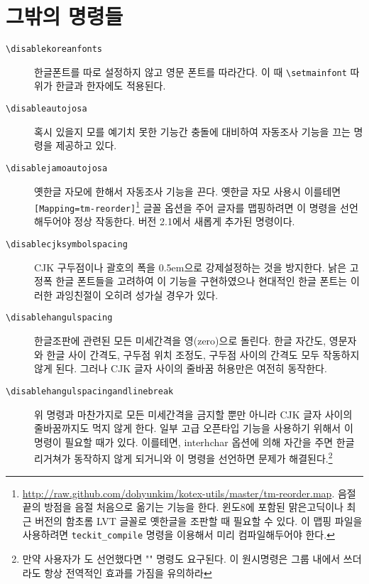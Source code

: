 \documentclass[a4paper]{article}
\def\logoko{\textsf{k}\kern-.1em\textit{o}}
\def\xetexko{\XeTeX\kern-.1ex -\logoko}
\def\cs#1{\texttt{\color{blue!50!black}\textbackslash #1}}
\begin{document}
\section{그밖의 명령들}
\begin{description}
  \item[\cs{disablekoreanfonts}]
한글폰트를 따로 설정하지 않고 영문 폰트를 따라간다.
이 때  \verb|\setmainfont| 따위가 한글과 한자에도 적용된다.

  \item[\cs{disableautojosa}]
혹시 있을지 모를 예기치 못한 기능간 충돌에 대비하여 자동조사 기능을
끄는 명령을 제공하고 있다.

  \item[\cs{disablejamoautojosa}]
옛한글 자모에 한해서 자동조사 기능을 끈다.
옛한글 자모 사용시 이를테면 \verb|[Mapping=tm-reorder]|\footnote{%
  \url{http://raw.github.com/dohyunkim/kotex-utils/master/tm-reorder.map}.
  음절 끝의 방점을 음절 처음으로 옮기는 기능을 한다.  윈도8에 포함된
  맑은고딕이나 최근 버전의 함초롬 LVT 글꼴로 옛한글을 조판할 때 필요할 수
  있다. 이 맵핑 파일을 사용하려면 \texttt{teckit\_compile} 명령을 이용해서
  미리 컴파일해두어야 한다.}
글꼴 옵션을 주어 글자를 맵핑하려면 이 명령을 선언해두어야 정상 작동한다.
버전 2.1에서 새롭게 추가된 명령이다.

  \item[\cs{disablecjksymbolspacing}]
CJK 구두점이나 괄호의 폭을 0.5em으로 강제설정하는 것을 방지한다.
 낡은 고정폭 한글 폰트들을 고려하여 이 기능을 구현하였으나
현대적인 한글 폰트는 이러한 과잉친절이 오히려 성가실 경우가 있다.

  \item[\cs{disablehangulspacing}]
한글조판에 관련된 모든 미세간격을 영(zero)으로 돌린다. 한글 자간도,
영문자와 한글 사이 간격도, 구두점 위치 조정도, 구두점 사이의 간격도
모두 작동하지 않게 된다. 그러나 CJK 글자 사이의 줄바꿈 허용만은 여전히
동작한다.

  \item[\cs{disablehangulspacingandlinebreak}]
위 명령과 마찬가지로 모든 미세간격을 금지할 뿐만 아니라 CJK 글자 사이의
줄바꿈까지도 먹지 않게 한다.
일부 고급 오픈타입 기능을 사용하기 위해서 이 명령이 필요할 때가 있다.
이를테면, interhchar 옵션에 의해 자간을 주면 한글 리거쳐가
동작하지 않게 되거니와 이 명령을 선언하면 문제가
해결된다.\footnote{만약 사용자가
  {\ttfamily\string\XeTeXlinebreaklocale}도 선언했다면
  {\ttfamily\string\XeTeXlinebreaklocale""} 명령도 요구된다.
  이 원시명령은 그룹 내에서 쓰더라도 항상 전역적인 효과를 가짐을 유의하라}
\end{description}
\end{document}
